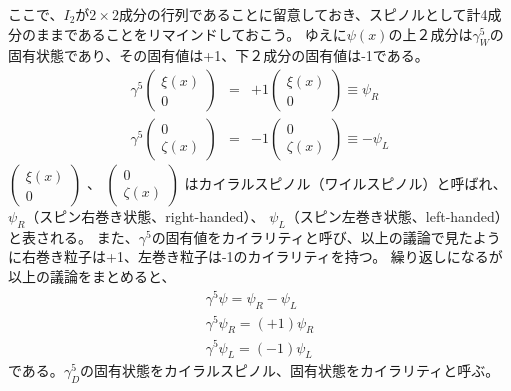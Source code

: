 ここで、$I_2$が$2\times2$成分の行列であることに留意しておき、スピノルとして計4成分のままであることをリマインドしておこう。
ゆえに$\psi(x)$の上２成分は$\gamma^5_W$の固有状態であり、その固有値は+1、下２成分の固有値は-1である。
\begin{eqnarray}
  \gamma^5 
  \left(
    \begin{array}{c}
      \xi(x) \\
      0
    \end{array}
  \right)
  &=& 
  +1
  \left(
    \begin{array}{c}
      \xi(x) \\
      0
    \end{array}
  \right)
  \equiv
  \psi_R \\
  \gamma^5 
  \left(
    \begin{array}{c}
      0 \\
      \zeta(x) 
    \end{array}
  \right)
  &=& 
  -1
  \left(
    \begin{array}{c}
      0 \\
      \zeta(x)
    \end{array}
  \right)
  \equiv
  -
  \psi_L
\end{eqnarray}
$
  \left(
    \begin{array}{c}
      \xi(x) \\
     0 
    \end{array}
  \right)
$
、
$
  \left(
    \begin{array}{c}
      0 \\
      \zeta(x)
    \end{array}
  \right)
$
はカイラルスピノル（ワイルスピノル）と呼ばれ、$\psi_R$（スピン右巻き状態、right-handed）、 $\psi_L$（スピン左巻き状態、left-handed）と表される。
また、$\gamma^5$の固有値をカイラリティと呼び、以上の議論で見たように右巻き粒子は+1、左巻き粒子は-1のカイラリティを持つ。
繰り返しになるが以上の議論をまとめると、
\begin{eqnarray}
  \gamma^5\psi = \psi_R - \psi_L \\
  \gamma^5\psi_R = (+1)\psi_R \\
  \gamma^5\psi_L = (-1)\psi_L 
\end{eqnarray}
である。$\gamma_D^5$の固有状態をカイラルスピノル、固有状態をカイラリティと呼ぶ。

